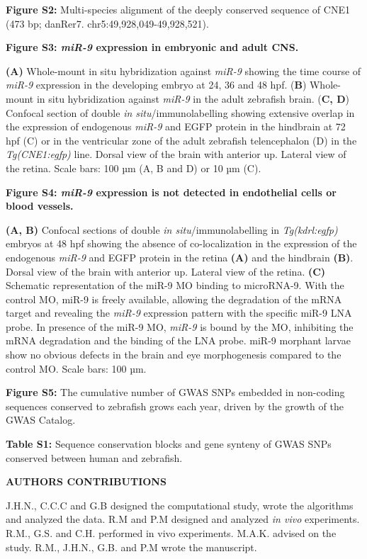 \documentclass[]{article}
\begin{document}
\textbf{Figure S2:} Multi-species alignment of the deeply conserved
sequence of CNE1 (473 bp; danRer7. chr5:49,928,049-49,928,521).

\textbf{Figure S3: \emph{miR-9} expression in embryonic and adult CNS.}

\textbf{(A)} Whole-mount in situ hybridization against \emph{miR-9}
showing the time course of \emph{miR-9} expression in the developing
embryo at 24, 36 and 48 hpf. (\textbf{B}) Whole-mount in situ
hybridization against \emph{miR-9} in the adult zebrafish brain.
(\textbf{C, D}) Confocal section of double \emph{in
situ}/immunolabelling showing extensive overlap in the expression of
endogenous \emph{miR-9} and EGFP protein in the hindbrain at 72 hpf (C)
or in the ventricular zone of the adult zebrafish telencephalon (D) in
the \emph{Tg(CNE1:egfp)} line. Dorsal view of the brain with anterior
up. Lateral view of the retina. Scale bars: 100 µm (A, B and D) or 10 µm
(C).

\textbf{Figure S4: \emph{miR-9} expression is not detected in
endothelial cells or blood vessels. }

\textbf{(A, B)} Confocal sections of double \emph{in
situ}/immunolabelling in \emph{Tg(kdrl:egfp)} embryos at 48 hpf showing
the absence of co-localization in the expression of the endogenous
\emph{miR-9} and EGFP protein in the retina \textbf{(A)} and the
hindbrain \textbf{(B)}. Dorsal view of the brain with anterior up.
Lateral view of the retina. \textbf{(C)} Schematic representation of the
miR-9 MO binding to microRNA-9. With the control MO, miR-9 is freely
available, allowing the degradation of the mRNA target and revealing the
\emph{miR-9} expression pattern with the specific miR-9 LNA probe. In
presence of the miR-9 MO, \emph{miR-9} is bound by the MO, inhibiting
the mRNA degradation and the binding of the LNA probe. miR-9 morphant
larvae show no obvious defects in the brain and eye morphogenesis
compared to the control MO. Scale bars: 100 µm.

\textbf{Figure S5:} The cumulative number of GWAS SNPs embedded in
non-coding sequences conserved to zebrafish grows each year, driven by
the growth of the GWAS Catalog.

\textbf{Table S1:} Sequence conservation blocks and gene synteny of GWAS
SNPs conserved between human and zebrafish.\textbf{\\
}

\textbf{AUTHORS CONTRIBUTIONS}

J.H.N., C.C.C and G.B designed the computational study, wrote the
algorithms and analyzed the data. R.M and P.M designed and analyzed
\emph{in vivo} experiments. R.M., G.S. and C.H. performed in vivo
experiments. M.A.K. advised on the study. R.M., J.H.N., G.B. and P.M
wrote the manuscript.
\end{document}
